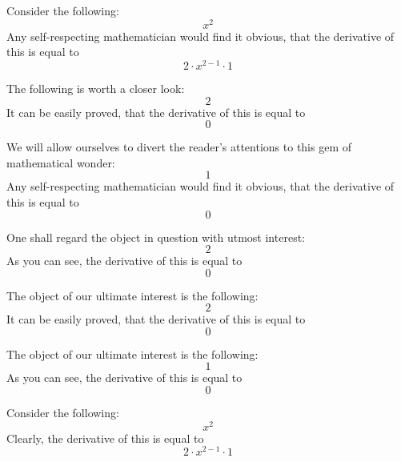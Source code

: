 \documentclass{article}
\begin{document}
Consider the following:
\begin{equation}
x ^{2 } 
\end{equation}
Any self-respecting mathematician would find it obvious, that the derivative of this is equal to
\begin{equation}
2 \cdot x ^{2 - 1 } \cdot 1 
\end{equation}

The following is worth a closer look:
\begin{equation}
2 
\end{equation}
It can be easily proved, that the derivative of this is equal to
\begin{equation}
0 
\end{equation}

We will allow ourselves to divert the reader's attentions to this gem of mathematical wonder:
\begin{equation}
1 
\end{equation}
Any self-respecting mathematician would find it obvious, that the derivative of this is equal to
\begin{equation}
0 
\end{equation}

One shall regard the object in question with utmost interest:
\begin{equation}
2 
\end{equation}
As you can see, the derivative of this is equal to
\begin{equation}
0 
\end{equation}

The object of our ultimate interest is the following:
\begin{equation}
2 
\end{equation}
It can be easily proved, that the derivative of this is equal to
\begin{equation}
0 
\end{equation}

The object of our ultimate interest is the following:
\begin{equation}
1 
\end{equation}
As you can see, the derivative of this is equal to
\begin{equation}
0 
\end{equation}

Consider the following:
\begin{equation}
x ^{2 } 
\end{equation}
Clearly, the derivative of this is equal to
\begin{equation}
2 \cdot x ^{2 - 1 } \cdot 1 
\end{equation}
\end{document}
